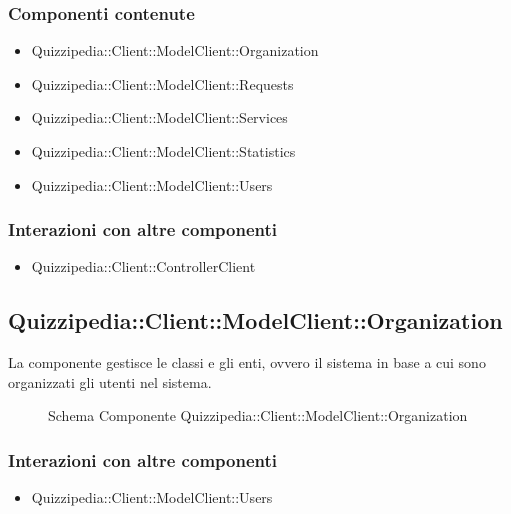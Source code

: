 \subsubsection{Componenti contenute}
\begin{itemize}
\item Quizzipedia::Client::ModelClient::Organization
\item Quizzipedia::Client::ModelClient::Requests
\item Quizzipedia::Client::ModelClient::Services
\item Quizzipedia::Client::ModelClient::Statistics
\item Quizzipedia::Client::ModelClient::Users
\end{itemize}
\subsubsection{Interazioni con altre componenti}
\begin{itemize}
\item Quizzipedia::Client::ControllerClient
\end{itemize}
\subsection{Quizzipedia::Client::ModelClient::Organization}
La componente gestisce le classi e gli enti, ovvero il sistema in base a cui sono organizzati gli utenti nel sistema.
\begin{figure}[H]
\centering
\noindent{}
\caption[Schema Componente Quizzipedia::Client::ModelClient::Organization]{Schema Componente Quizzipedia::Client::ModelClient::Organization}
\end{figure}
\subsubsection{Interazioni con altre componenti}
\begin{itemize}
\item Quizzipedia::Client::ModelClient::Users
\end{itemize}
